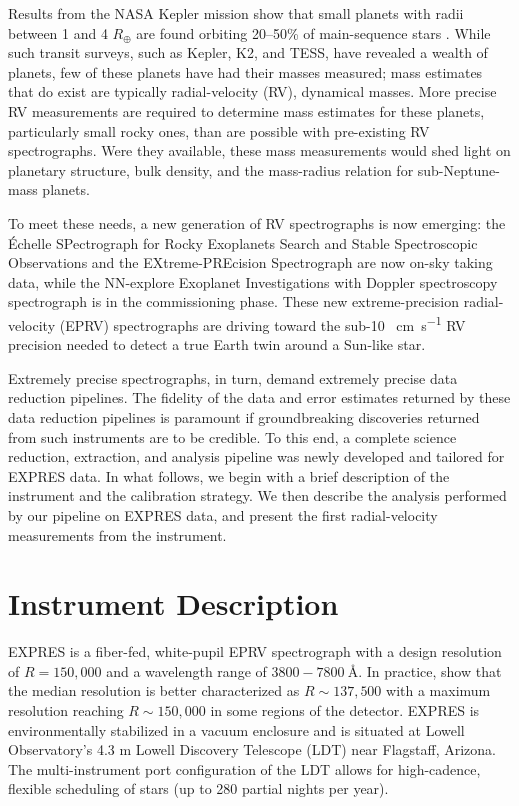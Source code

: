 Results from the NASA Kepler mission show that small planets with radii between 1 and 4 $R_{\oplus}$ are found orbiting 20--50\% of main-sequence stars \citep{winn_occurrence_2015}. While such transit surveys, such as Kepler, K2, and TESS, have revealed a wealth of planets, few of these planets have had their masses measured; mass estimates that do exist are typically radial-velocity (RV), dynamical masses. More precise RV measurements are required to determine mass estimates for these planets, particularly small rocky ones, than are possible with pre-existing RV spectrographs. Were they available, these mass measurements would shed light on planetary structure, bulk density, and the mass-radius relation for sub-Neptune-mass planets. 

To meet these needs, a new generation of RV spectrographs is now emerging: the \'Echelle SPectrograph for Rocky Exoplanets Search and Stable Spectroscopic Observations \citep[ESPRESSO:][]{pepe_espresso_2013} and the EXtreme-PREcision Spectrograph \citep[EXPRES:][]{jurgenson_expres_2016} are now on-sky taking data, while the NN-explore Exoplanet Investigations with Doppler spectroscopy spectrograph \citep{schwab_design_2016} is in the commissioning phase. These new extreme-precision radial-velocity (EPRV) spectrographs are driving toward the sub-10 ~\si{\centi\meter\per\second} RV precision needed to detect a true Earth twin around a Sun-like star.

Extremely precise spectrographs, in turn, demand extremely precise data reduction pipelines. The fidelity of the data and error estimates returned by these data reduction pipelines is paramount if groundbreaking discoveries returned from such instruments are to be credible. To this end, a complete science reduction, extraction, and analysis pipeline was newly developed and tailored for EXPRES data. In what follows, we begin with a brief description of the instrument and the calibration strategy. We then describe the analysis performed by our pipeline on EXPRES data, and present the first radial-velocity measurements from the instrument.

\section{Instrument Description}
\label{pipeline:instrument}

EXPRES is a fiber-fed, white-pupil EPRV spectrograph with a design resolution of $R = 150,000$ and a wavelength range of $3800-7800~\si{\angstrom}$. In practice, \citet{blackman_performance_2020} show that the median resolution is better characterized as $R \sim 137,500$ with a maximum resolution reaching $R \sim 150,000$ in some regions of the detector. EXPRES is environmentally stabilized in a vacuum enclosure and is situated at Lowell Observatory's 4.3 m Lowell Discovery Telescope (LDT) near Flagstaff, Arizona. The multi-instrument port configuration of the LDT allows for high-cadence, flexible scheduling of stars (up to 280 partial nights per year).

